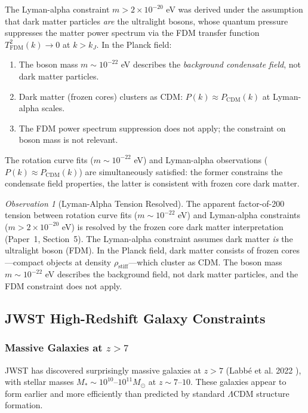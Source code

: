 \documentclass[11pt,a4paper]{article}
\newcommand{\rhostiff}{\ensuremath{\rho_{\mathrm{stiff}}}}
\newcommand{\Msun}{\ensuremath{M_\odot}}
\theoremstyle{definition}
\theoremstyle{remark}
\newtheorem{observation}{Observation}[section]
\begin{document}
The Lyman-alpha constraint $m > 2 \times 10^{-20}$ eV was derived under the assumption that dark matter particles \emph{are} the ultralight bosons, whose quantum pressure suppresses the matter power spectrum via the FDM transfer function $T^2_{\mathrm{FDM}}(k) \to 0$ at $k > k_J$. In the Planck field:
\begin{enumerate}[leftmargin=*, itemsep=0.2em]
\item The boson mass $m \sim 10^{-22}$ eV describes the \emph{background condensate field}, not dark matter particles.
\item Dark matter (frozen cores) clusters as CDM: $P(k) \approx P_{\mathrm{CDM}}(k)$ at Lyman-alpha scales.
\item The FDM power spectrum suppression does not apply; the constraint on boson mass is not relevant.
\end{enumerate}

The rotation curve fits ($m \sim 10^{-22}$ eV) and Lyman-alpha observations ($P(k) \approx P_{\mathrm{CDM}}(k)$) are simultaneously satisfied: the former constrains the condensate field properties, the latter is consistent with frozen core dark matter.

\begin{observation}[Lyman-Alpha Tension Resolved]
The apparent factor-of-200 tension between rotation curve fits ($m \sim 10^{-22}$ eV) and Lyman-alpha constraints ($m > 2 \times 10^{-20}$ eV) is resolved by the frozen core dark matter interpretation (Paper~1, Section~5). The Lyman-alpha constraint assumes dark matter \emph{is} the ultralight boson (FDM). In the Planck field, dark matter consists of frozen cores---compact objects at density $\rhostiff$---which cluster as CDM. The boson mass $m \sim 10^{-22}$ eV describes the background field, not dark matter particles, and the FDM constraint does not apply.
\end{observation}

\subsection{JWST High-Redshift Galaxy Constraints}
\label{sec:JWST}

\subsubsection{Massive Galaxies at $z > 7$}

JWST has discovered surprisingly massive galaxies at $z > 7$ (Labb\'e et al. 2022 \cite{Labbe2022}), with stellar masses $M_* \sim 10^{10}$--$10^{11} \Msun$ at $z \sim 7$--$10$. These galaxies appear to form earlier and more efficiently than predicted by standard $\Lambda$CDM structure formation.
\end{document}
